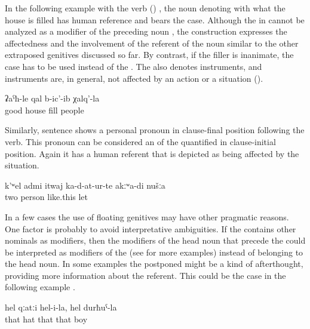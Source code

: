 In the following example  with the verb  () , the noun denoting with what the house is filled has human reference and bears the  case. Although the  in  cannot be analyzed as a modifier of the preceding noun  , the construction expresses the affectedness and the involvement of the referent of the noun   similar to the other extraposed genitives discussed so far. By contrast, if the filler is inanimate, the  case has to be used instead of the . The  also denotes instruments, and instruments are, in general, not affected by an action or a situation ().
%
\begin{exe}
	\ex	\label{ex:the house filled well with people}
	\gll	ʡaˁħ-le	qal	b-ic'-ib	χalq'-la\\
		good	house	fill	people\\
	\glt	{}
\end{exe}

Similarly, sentence  shows a personal pronoun in clause-final position following the verb. This pronoun can be considered an  of the quantified    in clause-initial position. Again it has a human referent that is depicted as being affected by the situation.
%
\begin{exe}
	\ex	\label{ex:‎‎‎(She) did not put the two of us like this}
	\gll	k'ʷel admi	itwaj	ka-d-at-ur-te	akːʷa-di	nušːa\\
		two	person	like.this	let 		\\
	\glt	{}
\end{exe}

In a few cases the use of floating genitives may have other pragmatic reasons. One factor is probably to avoid interpretative ambiguities. If the  contains other nominals as modifiers, then the modifiers of the head noun that precede the  could be interpreted as modifiers of the  (see  for more examples) instead of belonging to the head noun. In some examples the postponed  might be a kind of afterthought, providing more information about the referent. This could be the case in the following example .
%
\begin{exe}
	\ex	\label{ex:the hat of him, of the boy}
	\gll	hel	qːatːi	hel-i-la,	hel	durħuˁ-la\\
		that	hat	that	that	boy\\
	\glt	{}
\end{exe}

